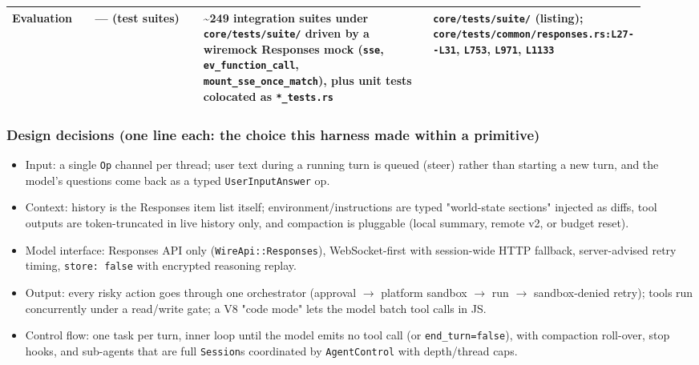 \begin{longtable}{@{}p{0.13\linewidth}p{0.17\linewidth}p{0.36\linewidth}p{0.26\linewidth}@{}}
Evaluation & --- (test suites) & \textasciitilde{}249 integration suites under \texttt{core/\allowbreak{}tests/\allowbreak{}suite/\allowbreak{}} driven by a wiremock Responses mock (\texttt{sse}, \texttt{ev\_\allowbreak{}function\_\allowbreak{}call}, \texttt{mount\_\allowbreak{}sse\_\allowbreak{}once\_\allowbreak{}match}), plus unit tests colocated as \texttt{*\_\allowbreak{}tests.\allowbreak{}rs} & \texttt{core/\allowbreak{}tests/\allowbreak{}suite/\allowbreak{}} (listing); \texttt{core/\allowbreak{}tests/\allowbreak{}common/\allowbreak{}responses.\allowbreak{}rs:\allowbreak{}L27-\allowbreak{}-\allowbreak{}L31}, \texttt{L753}, \texttt{L971}, \texttt{L1133} \\
\bottomrule \end{longtable}

\subsubsection*{Design decisions (one line each: the choice this harness made within a primitive)}
\begin{itemize}
\item Input: a single \texttt{Op} channel per thread; user text during a running turn is queued (steer) rather than starting a new turn, and the model's questions come back as a typed \texttt{UserInputAnswer} op.
\item Context: history is the Responses item list itself; environment/instructions are typed "world-state sections" injected as diffs, tool outputs are token-truncated in live history only, and compaction is pluggable (local summary, remote v2, or budget reset).
\item Model interface: Responses API only (\texttt{WireApi:\allowbreak{}:\allowbreak{}Responses}), WebSocket-first with session-wide HTTP fallback, server-advised retry timing, \texttt{store:\allowbreak{} false} with encrypted reasoning replay.
\item Output: every risky action goes through one orchestrator (approval $\rightarrow$ platform sandbox $\rightarrow$ run $\rightarrow$ sandbox-denied retry); tools run concurrently under a read/write gate; a V8 "code mode" lets the model batch tool calls in JS.
\item Control flow: one task per turn, inner loop until the model emits no tool call (or \texttt{end\_\allowbreak{}turn=false}), with compaction roll-over, stop hooks, and sub-agents that are full \texttt{Session}s coordinated by \texttt{AgentControl} with depth/thread caps.
\end{itemize}

